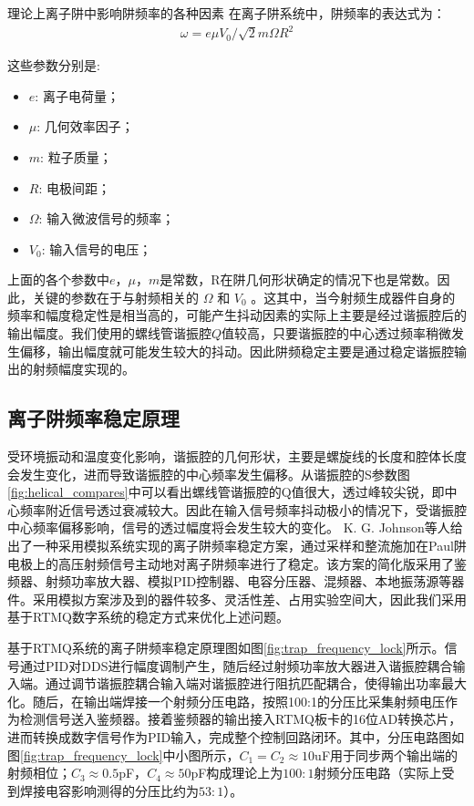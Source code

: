 理论上离子阱中影响阱频率的各种因素
在离子阱系统中，阱频率的表达式为：
\begin{align}
    \omega=e\mu V_0/\sqrt{2}m\Omega R^2
\end{align}

这些参数分别是:
\begin{itemize}
    \item $e$: 离子电荷量；
    \item $\mu$: 几何效率因子；
    \item $m$: 粒子质量；
    \item $R$: 电极间距；
    \item $\Omega$: 输入微波信号的频率；
    \item $V_0$: 输入信号的电压；
\end{itemize}


上面的各个参数中$e$，$\mu$，$m$是常数，R在阱几何形状确定的情况下也是常数。因此，关键的参数在于与射频相关的 $\Omega$ 和 $V_0$ 。这其中，当今射频生成器件自身的频率和幅度稳定性是相当高的，可能产生抖动因素的实际上主要是经过谐振腔后的输出幅度。我们使用的螺线管谐振腔$Q$值较高，只要谐振腔的中心透过频率稍微发生偏移，输出幅度就可能发生较大的抖动。因此阱频稳定主要是通过稳定谐振腔输出的射频幅度实现的。




\subsection[离子阱频率稳定原理]{离子阱频率稳定原理}
受环境振动和温度变化影响，谐振腔的几何形状，主要是螺旋线的长度和腔体长度会发生变化，进而导致谐振腔的中心频率发生偏移。从谐振腔的S参数图\ref{fig:helical_compares}中可以看出螺线管谐振腔的Q值很大，透过峰较尖锐，即中心频率附近信号透过衰减较大。因此在输入信号频率抖动极小的情况下，受谐振腔中心频率偏移影响，信号的透过幅度将会发生较大的变化。
K. G. Johnson等人\cite[]{Johnson_Wong_Campos_Restelli_Landsman_Neyenhuis_Mizrahi_Monroe_2016}给出了一种采用模拟系统实现的离子阱频率稳定方案，通过采样和整流施加在Paul阱电极上的高压射频信号主动地对离子阱频率进行了稳定。该方案的简化版采用了鉴频器、射频功率放大器、模拟PID控制器、电容分压器、混频器、本地振荡源等器件。采用模拟方案涉及到的器件较多、灵活性差、占用实验空间大，因此我们采用基于RTMQ数字系统的稳定方式来优化上述问题。

基于RTMQ系统的离子阱频率稳定原理图如图\ref{fig:trap_frequency_lock}所示。信号通过PID对DDS进行幅度调制产生，随后经过射频功率放大器进入谐振腔耦合输入端。通过调节谐振腔耦合输入端对谐振腔进行阻抗匹配耦合，使得输出功率最大化。随后，在输出端焊接一个射频分压电路，按照100:1的分压比采集射频电压作为检测信号送入鉴频器。接着鉴频器的输出接入RTMQ板卡的16位AD转换芯片，进而转换成数字信号作为PID输入，完成整个控制回路闭环。其中，分压电路图如图\ref{fig:trap_frequency_lock}中小图所示，$C_1=C_2\approx10$uF用于同步两个输出端的射频相位；$C_3\approx0.5$pF，$C_4\approx50$pF构成理论上为$100:1$射频分压电路（实际上受到焊接电容影响测得的分压比约为$53:1$）。

